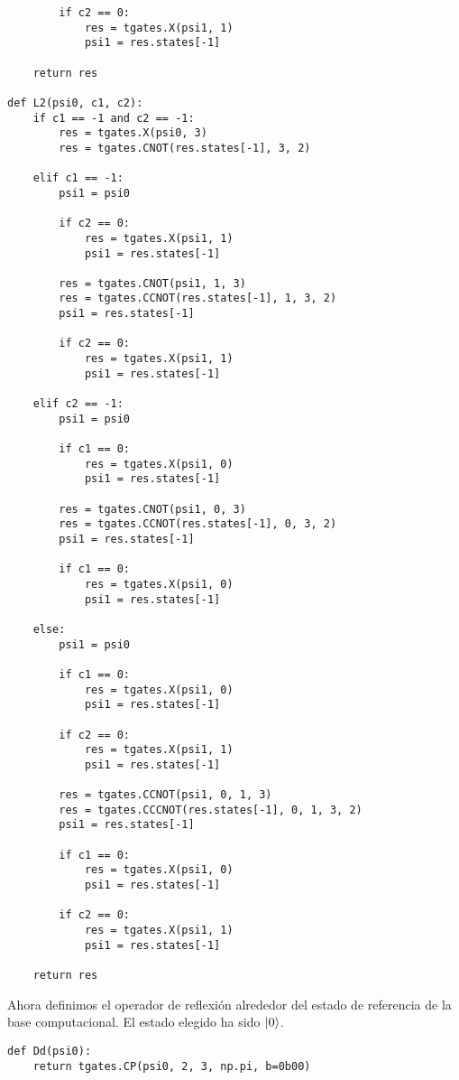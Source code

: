 \begin{verbatim}
        if c2 == 0:
            res = tgates.X(psi1, 1)
            psi1 = res.states[-1]

    return res

def L2(psi0, c1, c2):
    if c1 == -1 and c2 == -1:
        res = tgates.X(psi0, 3)
        res = tgates.CNOT(res.states[-1], 3, 2)

    elif c1 == -1:
        psi1 = psi0

        if c2 == 0:
            res = tgates.X(psi1, 1)
            psi1 = res.states[-1]

        res = tgates.CNOT(psi1, 1, 3)
        res = tgates.CCNOT(res.states[-1], 1, 3, 2)
        psi1 = res.states[-1]

        if c2 == 0:
            res = tgates.X(psi1, 1)
            psi1 = res.states[-1]

    elif c2 == -1:
        psi1 = psi0

        if c1 == 0:
            res = tgates.X(psi1, 0)
            psi1 = res.states[-1]

        res = tgates.CNOT(psi1, 0, 3)
        res = tgates.CCNOT(res.states[-1], 0, 3, 2)
        psi1 = res.states[-1]

        if c1 == 0:
            res = tgates.X(psi1, 0)
            psi1 = res.states[-1]

    else:
        psi1 = psi0

        if c1 == 0:
            res = tgates.X(psi1, 0)
            psi1 = res.states[-1]

        if c2 == 0:
            res = tgates.X(psi1, 1)
            psi1 = res.states[-1]

        res = tgates.CCNOT(psi1, 0, 1, 3)
        res = tgates.CCCNOT(res.states[-1], 0, 1, 3, 2)
        psi1 = res.states[-1]

        if c1 == 0:
            res = tgates.X(psi1, 0)
            psi1 = res.states[-1]

        if c2 == 0:
            res = tgates.X(psi1, 1)
            psi1 = res.states[-1]

    return res
\end{verbatim}

Ahora definimos el operador de reflexión alrededor del estado de referencia de la base computacional. El estado elegido ha sido $\ket{0}$.

\begin{verbatim}
def Dd(psi0):
    return tgates.CP(psi0, 2, 3, np.pi, b=0b00)
\end{verbatim}

